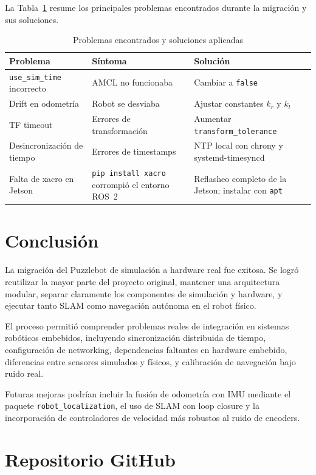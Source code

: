 \documentclass[conference]{IEEEtran}
\begin{document}
La Tabla~\ref{tab:problemas} resume los principales problemas encontrados
durante la migración y sus soluciones.

\begin{table}[htbp]
\caption{Problemas encontrados y soluciones aplicadas}
\label{tab:problemas}
\begin{tabular}{p{2.0cm} p{2.6cm} p{2.6cm}}
\toprule
\textbf{Problema} & \textbf{Síntoma} & \textbf{Solución} \\
\midrule
\texttt{use\_sim\_time} incorrecto &
AMCL no funcionaba &
Cambiar a \texttt{false} \\
\addlinespace
Drift en odometría &
Robot se desviaba &
Ajustar constantes $k_r$ y $k_l$ \\
\addlinespace
TF timeout &
Errores de transformación &
Aumentar \texttt{transform\_tolerance} \\
\addlinespace
Desincronización de tiempo &
Errores de timestamps &
NTP local con chrony y systemd-timesyncd \\
\addlinespace
Falta de xacro en Jetson &
\texttt{pip install xacro} corrompió el entorno ROS~2 &
Reflasheo completo de la Jetson; instalar con \texttt{apt} \\
\bottomrule
\end{tabular}
\end{table}

\section{Conclusión}

La migración del Puzzlebot de simulación a hardware real fue exitosa. Se logró
reutilizar la mayor parte del proyecto original, mantener una arquitectura
modular, separar claramente los componentes de simulación y hardware, y
ejecutar tanto SLAM como navegación autónoma en el robot físico.

El proceso permitió comprender problemas reales de integración en sistemas
robóticos embebidos, incluyendo sincronización distribuida de tiempo,
configuración de networking, dependencias faltantes en hardware embebido,
diferencias entre sensores simulados y físicos, y calibración de navegación
bajo ruido real.

Futuras mejoras podrían incluir la fusión de odometría con IMU mediante el
paquete \texttt{robot\_localization}, el uso de SLAM con loop closure y la
incorporación de controladores de velocidad más robustos al ruido de encoders.

\section*{Repositorio GitHub}
\end{document}
